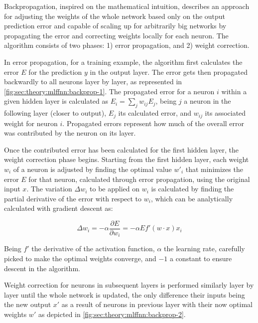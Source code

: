 Backpropagation, inspired on the mathematical intuition, describes an approach for adjusting the weights of the whole network based only on the output prediction error and capable of scaling up for arbitrarily big networks by propagating the error and correcting weights locally for each neuron.
The algorithm consists of two phases: 1) error propagation, and 2) weight correction.

In error propagation, for a training example, the algorithm first calculates the error $E$ for the prediction $y$ in the output layer.
The error gets then propagated backwardly to all neurons layer by layer, as represented in \autoref{fig:sec:theory:mlffnn:backprop-1}.
The propagated error for a neuron $i$ within a given hidden layer is calculated as $E_{i} = \sum_j w_{ij} E_{j}$, being $j$ a neuron in the following layer (closer to output), $E_{j}$ its calculated error, and $w_{ij}$ its associated weight for neuron $i$.
Propagated errors represent how much of the overall error was contributed by the neuron on its layer.

Once the contributed error has been calculated for the first hidden layer, the weight correction phase begins.
Starting from the first hidden layer, each weight $w_i$ of a neuron is adjusted by finding the optimal value $w'_i$ that minimizes the error $E$ for that neuron, calculated through error propagation, using the original input $x$.
The variation $\Delta w_i$ to be applied on $w_i$ is calculated by finding the partial derivative of the error with respect to $w_i$, which can be analytically calculated \cite{Orr2008} with gradient descent as:

\begin{equation}
  \Delta w_i =
    -\alpha \frac{\partial E}{\partial w_i} =
    -\alpha E f'({w}\cdot{x}) x_i
\end{equation}

Being $f'$ the derivative of the activation function, $\alpha$ the learning rate, carefully picked to make the optimal weights converge, and $-1$ a constant to ensure descent in the algorithm.

Weight correction for neurons in subsequent layers is performed similarly layer by layer until the whole network is updated, the only difference their inputs being the new output $x'$ as a result of neurons in previous layer with their now optimal weights $w'$ as depicted in \autoref{fig:sec:theory:mlffnn:backprop-2}.

